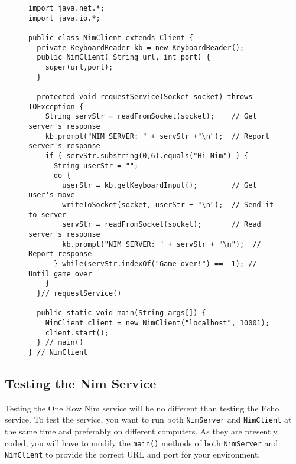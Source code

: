 {\begin{figure}[tb]
\jjjprogstart
\begin{jjjlisting}[34pc]
\begin{lstlisting}
import java.net.*;
import java.io.*;

public class NimClient extends Client {
  private KeyboardReader kb = new KeyboardReader();
  public NimClient( String url, int port) {
    super(url,port);
  }

  protected void requestService(Socket socket) throws IOException {
    String servStr = readFromSocket(socket);    // Get server's response
    kb.prompt("NIM SERVER: " + servStr +"\n");  // Report server's response
    if ( servStr.substring(0,6).equals("Hi Nim") ) {
      String userStr = "";
      do {
        userStr = kb.getKeyboardInput();        // Get user's move
        writeToSocket(socket, userStr + "\n");  // Send it to server
        servStr = readFromSocket(socket);       // Read server's response
        kb.prompt("NIM SERVER: " + servStr + "\n");  // Report response
      } while(servStr.indexOf("Game over!") == -1); // Until game over
    }
  }// requestService()

  public static void main(String args[]) {
    NimClient client = new NimClient("localhost", 10001);
    client.start();
  } // main()
} // NimClient
\end{lstlisting}
\end{jjjlisting}
\end{figure}


\subsection{Testing the Nim Service}
\noindent Testing the One Row Nim service will be no different
than testing the Echo service.  To test the service, you want to run
both {\tt NimServer} and {\tt NimClient} at the same time and
preferably on different computers.  As they are presently coded, you
will have to modify the {\tt main()} methods of both {\tt NimServer}
and {\tt NimClient} to provide the correct URL and port for your
environment.

\label{self-study-exercise}

}
